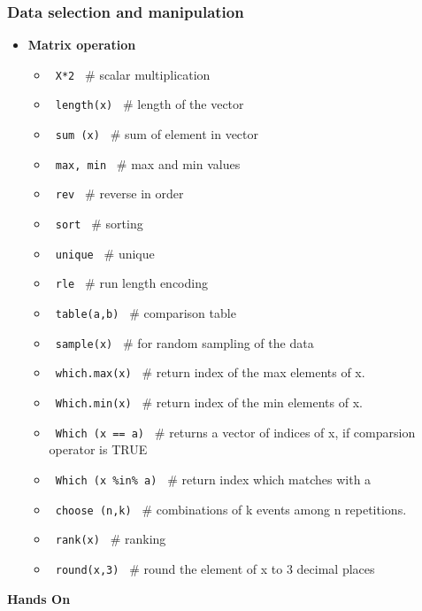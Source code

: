 \documentclass[12pt]{beamer}
\begin{document}
\begin{frame}[shrink=10,fragile]
\frametitle{Data selection and manipulation}
\begin{itemize}\justifying
	\item \textbf{Matrix operation }
	\begin{itemize}\justifying
		\item \verb| X*2 | \hfill \# scalar multiplication
		\item \verb| length(x) | \hfill \# length of the vector
		\item \verb| sum (x) | \hfill \# sum of element in vector
		\item \verb| max, min | \hfill \# max and min values
		\item \verb| rev | \hfill \# reverse in order
		\item \verb| sort | \hfill \# sorting
		\item \verb| unique | \hfill \# unique
		\item \verb| rle | \hfill \# run length encoding
		\item \verb| table(a,b) | \hfill \# comparison table
		\item \verb| sample(x) | \hfill \# for random sampling of the data
		\item \verb| which.max(x) | \hfill \# return index of the max elements of x.
		\item \verb| Which.min(x) | \hfill \# return index of the min elements of x.
		\item \verb| Which (x == a) | \hfill \# returns a vector of indices of x, if
		comparsion operator is TRUE
		\item \verb| Which (x %in% a) | \hfill \# return index which matches with a
		\item \verb| choose (n,k) | \hfill \# combinations of k events among n repetitions.
		\item \verb| rank(x) | \hfill \# ranking
		\item \verb| round(x,3) | \hfill \# round the element of x to 3 decimal places
	\end{itemize}
\end{itemize}
\end{frame}

\begin{frame}
\begin{center}
	\begin{block}{}
		\hspace*{2in}\textbf{\LARGE \textcolor{idrbt_blue}{Hands On}}
\end{block}\end{center}
\end{frame}
\end{document}
